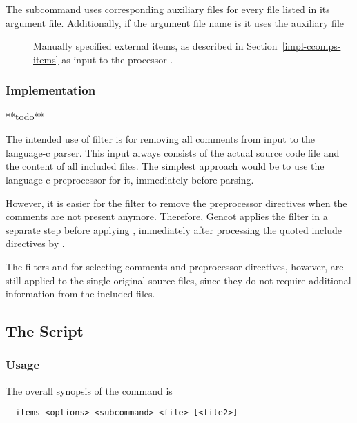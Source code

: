 The subcommand  uses corresponding auxiliary files for every file  listed in its argument file.
Additionally, if the argument file name is  it uses the auxiliary file
\begin{description}
\item[] Manually specified external items, as described in Section~\ref{impl-ccomps-items} as
input to the processor .
\end{description}

\subsubsection{Implementation}

**todo**

The intended use of filter  is for removing all comments from input to the language-c parser.
This input always consists of the actual source code file and the content of all included files. The simplest approach
would be to use the language-c preprocessor for it, immediately before parsing. 

However, it is easier for the filter  to remove the preprocessor directives when the comments are 
not present anymore. Therefore, Gencot applies the filter  in a separate step before applying
, immediately after processing the quoted include directives by .
 
The filters  and  for selecting comments and preprocessor directives, however, are
still applied to the single original source files, since they do not require additional information from the included files.


\subsection{The  Script}
\label{impl-all-items}

\subsubsection{Usage}

The overall synopsis of the  command is
\begin{verbatim}
  items <options> <subcommand> <file> [<file2>]
\end{verbatim}

